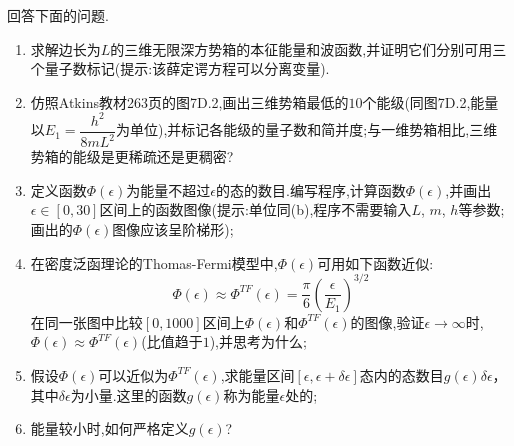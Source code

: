 \documentclass{ctexart}
\begin{document}
\begin{homework}[14.]
    回答下面的问题.
    \begin{enumerate}[label=(\alph*)]
        \item 求解边长为$L$的三维无限深方势箱的本征能量和波函数,并证明它们分别可用三个量子数标记(提示:该薛定谔方程可以分离变量).
        \item  仿照Atkins教材263页的图7D.2,画出三维势箱最低的$10$个能级(同图7D.2,能量以$E_1=\dfrac{h^2}{8mL^2}$为单位),并标记各能级的量子数和简并度;与一维势箱相比,三维势箱的能级是更稀疏还是更稠密?
        \item 定义函数$\Phi(\epsilon)$为能量不超过$\epsilon$的态的数目.编写程序,计算函数$\Phi(\epsilon)$,并画出$\epsilon\in[0,30]$区间上的函数图像(提示:单位同(b),程序不需要输入$L$, $m$, $h$等参数;画出的$\Phi(\epsilon)$图像应该呈阶梯形);
        \item 在密度泛函理论的Thomas-Fermi模型中,$\Phi(\epsilon)$可用如下函数近似:
        \[\Phi(\epsilon)\approx\Phi^{TF}(\epsilon)=\dfrac{\pi}{6}\left(\dfrac{\epsilon}{E_1}\right)^{3/2}\]
        在同一张图中比较$[0,1000]$区间上$\Phi(\epsilon)$和$\Phi^{TF}(\epsilon)$的图像,验证$\epsilon\to\infty$时,$\Phi(\epsilon)\approx\Phi^{TF}(\epsilon)$(比值趋于$1$),并思考为什么;
        \item  假设$\Phi(\epsilon)$可以近似为$\Phi^{TF}(\epsilon)$,求能量区间$[\epsilon,\epsilon+\delta\epsilon]$态内的态数目$g(\epsilon)\delta\epsilon$，其中$\delta\epsilon$为小量.这里的函数$g(\epsilon)$称为能量$\epsilon$处的;
        \item 能量较小时,如何严格定义$g(\epsilon)$?
    \end{enumerate}
\end{homework}
\end{document}
